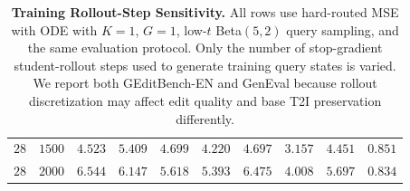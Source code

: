 \documentclass{llmxive}
\begin{document}
\begin{table}[t]
{\begin{tabular}{ll|ccccccc|c}
    $28$ & $1500$ & $4.523$ & $5.409$ & $4.699$ & $4.220$ & $4.697$ & $3.157$ & $4.451$ & $0.851$\\
    $28$ & $2000$ & $6.544$ & $6.147$ & $5.618$ & $5.393$ & $6.475$ & $4.008$ & $5.697$ & $0.834$\\
    \bottomrule
  \end{tabular}%
  }
\caption{\textbf{Training Rollout-Step Sensitivity.} All rows use hard-routed MSE with ODE with $K{=}1$, $G{=}1$, low-$t$ Beta$(5,2)$ query sampling, and the same evaluation protocol. Only the number of stop-gradient student-rollout steps used to generate training query states is varied. We report both GEditBench-EN and GenEval because rollout discretization may affect edit quality and base T2I preservation differently.}
\label{tab:rollout-step-sensitivity}
\end{table}





\end{document}
